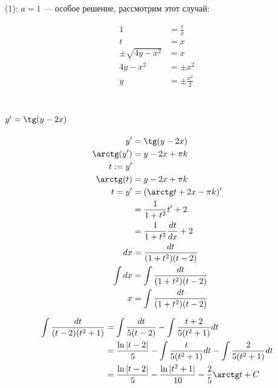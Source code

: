 (1): $a=1$ --- особое решение, рассмотрим этот случай:

\begin{align*}
    1                  & = \frac{t}{x}       \\
    t                  & = x                 \\
    \pm\sqrt{4y - x^2} & = x                 \\
    4y - x^2           & = \pm x^2           \\
    y                  & = \pm \frac{x^2}{2} \\
\end{align*}

\section{$y'=\tg(y-2x)$}

\begin{align*}
    y'         & = \tg(y - 2x)                      \\
    \arctg(y') & = y - 2x + \pi k                   \\
    t := y'                                         \\
    \arctg(t)  & = y - 2x + \pi k                   \\
    t = y'     & = (\arctg t + 2x - \pi k)'         \\
               & = \frac{1}{1+t^2}t' + 2            \\
               & = \frac{1}{1+t^2}\frac{dt}{dx} + 2 \\
    dx         & = \frac{dt}{(1+t^2)(t-2)}          \\
    \int dx    & = \int \frac{dt}{(1+t^2)(t-2)}     \\
    x          & = \int \frac{dt}{(1+t^2)(t-2)}     \\
\end{align*}

\begin{align*}
    \int \frac{dt}{(t - 2)(t^2+1)}
     & = \int \frac{dt}{5(t-2)} - \int \frac{t+2}{5(t^2+1)}dt                       \\
     & = \frac{\ln|t-2|}{5} - \int \frac{t}{5(t^2+1)}dt - \int \frac{2}{5(t^2+1)}dt \\
     & = \frac{\ln|t-2|}{5} - \frac{\ln|t^2+1|}{10} - \frac{2}{5}\arctg t + C       \\
\end{align*}

